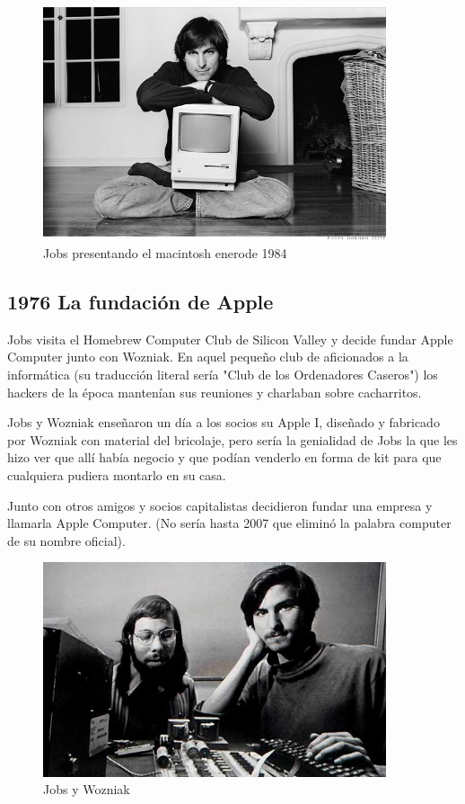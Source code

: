 \documentclass[notumble,10pt,a4paper]{leaflet}
\begin{document}
\begin{figure}[h!]
	\centering
	\includegraphics[width=0.9\textwidth]{img/steve-macintosh.jpg}
	\caption{Jobs presentando el macintosh enerode 1984}
\end{figure}

\newpage
\subsection{\large{1976 La fundación de Apple}}
Jobs visita el Homebrew Computer Club de Silicon Valley y decide fundar Apple Computer junto con Wozniak. En aquel pequeño club de aficionados a la informática (su traducción literal sería "Club de los Ordenadores Caseros") los hackers de la época mantenían sus reuniones y charlaban sobre cacharritos.

Jobs y Wozniak enseñaron un día a los socios su Apple I, diseñado y fabricado por Wozniak con material del bricolaje, pero sería la genialidad de Jobs la que les hizo ver que allí había negocio y que podían venderlo en forma de kit para que cualquiera pudiera montarlo en su casa.

Junto con otros amigos y socios capitalistas decidieron fundar una empresa y llamarla Apple Computer. (No sería hasta 2007 que eliminó la palabra computer de su nombre oficial).

\begin{figure}[b]
	\centering
	\includegraphics[width=0.9\textwidth]{img/apple.jpg}
	\caption{Jobs y Wozniak}
\end{figure}
\end{document}

